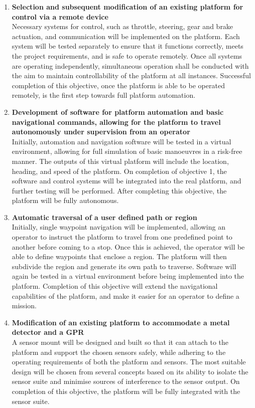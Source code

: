 \documentclass[main.tex]{subfiles}
\begin{document}
\begin{enumerate}
\item \textbf{Selection and subsequent modification of an existing platform for control via a remote device}\\ Necessary systems for control, such as throttle, steering, gear and brake actuation, and communication will be implemented on the platform. Each system will be tested separately to ensure that it functions correctly, meets the project requirements, and is safe to operate remotely. Once all systems are operating independently, simultaneous operation shall be conducted with the aim to maintain controllability of the platform at all instances. Successful completion of this objective, once the platform is able to be operated remotely, is the first step towards full platform automation.  

\item \textbf{Development of software for platform automation and basic navigational commands, allowing for the platform to travel autonomously under supervision from an operator}\\ Initially, automation and navigation software will be tested in a virtual environment, allowing for full simulation of basic manoeuvres in a risk-free manner. The outputs of this virtual platform will include the location, heading, and speed of the platform. On completion of objective 1, the software and control systems will be integrated into the real platform, and further testing will be performed. After completing this objective, the platform will be fully autonomous.

\item \textbf{Automatic traversal of a user defined path or region}\\ Initially, single waypoint navigation will be implemented, allowing an operator to instruct the platform to travel from one predefined point to another before coming to a stop. Once this is achieved, the operator will be able to define waypoints that enclose a region. The platform will then subdivide the region and generate its own path to traverse. Software will again be tested in a virtual environment before being implemented into the platform. Completion of this objective will extend the navigational capabilities of the platform, and make it easier for an operator to define a mission. 

\item \textbf{Modification of an existing platform to accommodate a metal detector and a GPR}\\ A sensor mount will be designed and built so that it can attach to the platform and support the chosen sensors safely, while adhering to the operating requirements of both the platform and sensors. The most suitable design will be chosen from several concepts based on its ability to isolate the sensor suite and minimise sources of interference to the sensor output. On completion of this objective, the platform will be fully integrated with the sensor suite.


\end{enumerate}
\end{document}

